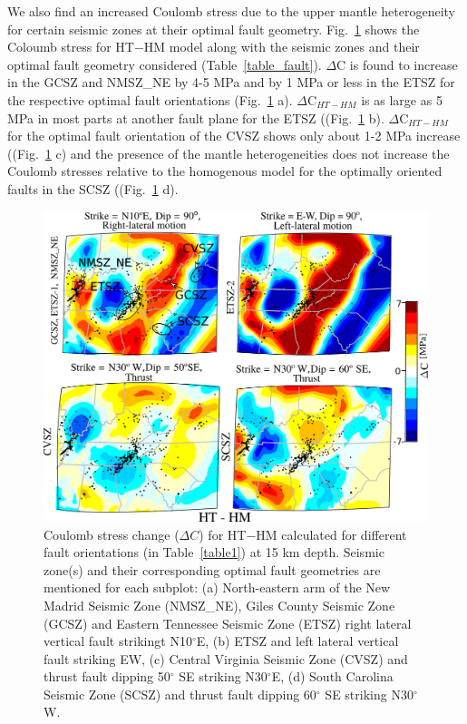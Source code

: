 \documentclass[draft,linenumbers]{agujournal2018}
\begin{document}
We also find an increased Coulomb stress due to the upper mantle heterogeneity for certain seismic zones at their optimal fault geometry. Fig.~\ref{ht_hm_cs} shows the Coloumb stress for HT$-$HM model along with the seismic zones and their optimal fault geometry considered (Table~\ref{table_fault}). 
$\Delta$C is found to increase in the GCSZ and NMSZ\_NE by 4-5 MPa and by 1 MPa or less in the ETSZ for the respective optimal fault orientations (Fig.~\ref{ht_hm_cs} a). $\Delta$C$_{HT-HM}$ is as large as 5 MPa in most parts at another fault plane for the ETSZ ((Fig.~\ref{ht_hm_cs} b). $\Delta$C$_{HT-HM}$ for the optimal fault orientation of the CVSZ shows only about 1-2 MPa increase ((Fig.~\ref{ht_hm_cs} c) and the presence of the mantle heterogeneities does not increase the Coulomb stresses relative to the homogenous model for the optimally oriented faults in the SCSZ ((Fig.~\ref{ht_hm_cs} d). 
%
\begin{figure}[h!]
    \centering
    \includegraphics[width=0.75\linewidth]{figures/cs_ht_hm.png}
    \caption{Coulomb stress change ($\Delta C$) for HT$-$HM calculated for different fault orientations (in Table~\ref{table1}) at 15 km depth. Seismic zone(s) and their corresponding optimal fault geometries are mentioned for each subplot: (a) North-eastern arm of the New Madrid Seismic Zone (NMSZ\_NE), Giles County Seismic Zone (GCSZ) and Eastern Tennessee Seismic Zone (ETSZ) right lateral vertical fault strikingt N10$^\circ$E, (b) ETSZ and left lateral vertical fault striking EW, (c) Central Virginia Seismic Zone (CVSZ) and thrust fault dipping 50$^\circ$ SE striking N30$^\circ$E, (d) South Carolina Seismic Zone (SCSZ) and thrust fault dipping 60$^\circ$ SE striking N30$^\circ$W.}
    \label{ht_hm_cs}
\end{figure}
\end{document}
